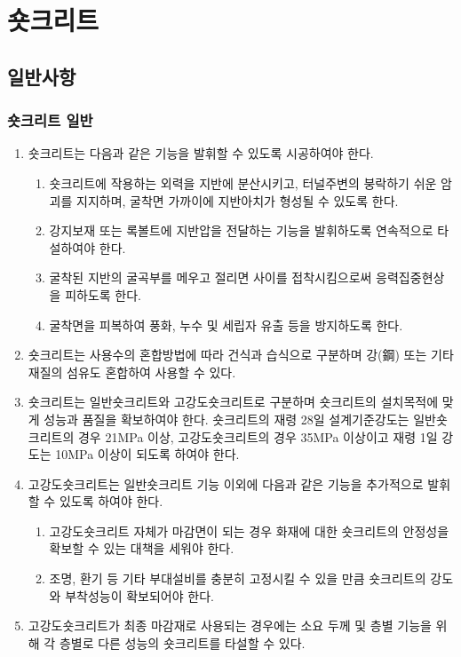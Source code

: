 \documentclass[12pt,a4paper]{article}
\begin{document}
\newpage
\section[숏크리트]{숏크리트}

\subsection{일반사항}

\subsubsection{숏크리트 일반}

\begin{enumerate}
\item 숏크리트는 다음과 같은 기능을 발휘할 수 있도록 시공하여야 한다.
	\begin{enumerate}
	\item 숏크리트에 작용하는 외력을 지반에 분산시키고, 터널주변의 붕락하기 쉬운 암괴를 지지하며, 굴착면 가까이에 지반아치가 형성될 수 있도록 한다. 
	\item 강지보재 또는 록볼트에 지반압을 전달하는 기능을 발휘하도록 연속적으로 타설하여야 한다.
	\item 굴착된 지반의 굴곡부를 메우고 절리면 사이를 접착시킴으로써 응력집중현상을 피하도록 한다.
	\item 굴착면을 피복하여 풍화, 누수 및 세립자 유출 등을 방지하도록 한다.
	\end{enumerate}
\item 숏크리트는 사용수의 혼합방법에 따라 건식과 습식으로 구분하며 강(鋼) 또는 기타 재질의 섬유도 혼합하여 사용할 수 있다.
\item 숏크리트는 일반숏크리트와 고강도숏크리트로 구분하며 숏크리트의 설치목적에 맞게 성능과 품질을 확보하여야 한다. 
      숏크리트의 재령 28일 설계기준강도는 일반숏크리트의 경우 21MPa 이상, 고강도숏크리트의 경우 35MPa 이상이고 
      재령 1일 강도는 10MPa 이상이 되도록 하여야 한다.
\item 고강도숏크리트는 일반숏크리트 기능 이외에 다음과 같은 기능을 추가적으로 발휘할 수 있도록 하여야 한다.   
	\begin{enumerate}
	\item 고강도숏크리트 자체가 마감면이 되는 경우 화재에 대한 숏크리트의 안정성을 확보할 수 있는 대책을 세워야 한다.  
	\item 조명, 환기 등 기타 부대설비를 충분히 고정시킬 수 있을 만큼 숏크리트의 강도와 부착성능이 확보되어야 한다.
	\end{enumerate}
\item 고강도숏크리트가 최종 마감재로 사용되는 경우에는 소요 두께 및 층별 기능을 위해 각 층별로 다른 성능의 숏크리트를 타설할 수 있다.
\end{enumerate}
\end{document}
